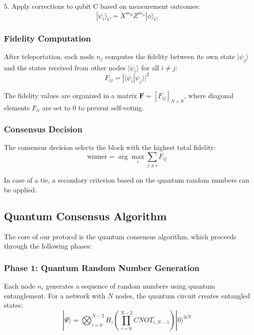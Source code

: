 \documentclass[11pt,a4paper]{article}
\begin{document}
5. Apply corrections to qubit C based on measurement outcomes:
   \begin{equation}
   |\psi_i\rangle_C = X^{m_B}Z^{m_A}|\phi\rangle_C
   \end{equation}

\subsubsection{Fidelity Computation}
After teleportation, each node $n_j$ computes the fidelity between its own state $|\psi_j\rangle$ and the states received from other nodes $|\psi_i\rangle$ for all $i \neq j$:
\begin{equation}
F_{ij} = |\langle\psi_i|\psi_j\rangle|^2
\end{equation}

The fidelity values are organized in a matrix $\mathbf{F} = [F_{ij}]_{N \times N}$, where diagonal elements $F_{ii}$ are set to 0 to prevent self-voting.

\subsubsection{Consensus Decision}
The consensus decision selects the block with the highest total fidelity:
\begin{equation}
\text{winner} = \arg\max_i \sum_{j \neq i} F_{ij}
\end{equation}

In case of a tie, a secondary criterion based on the quantum random numbers can be applied.

\subsection{Quantum Consensus Algorithm}
The core of our protocol is the quantum consensus algorithm, which proceeds through the following phases:

\subsubsection{Phase 1: Quantum Random Number Generation}
Each node $n_i$ generates a sequence of random numbers using quantum entanglement. For a network with $N$ nodes, the quantum circuit creates entangled states:
\begin{equation}
|\Psi\rangle = \bigotimes_{i=0}^{N-2} H_i \left( \prod_{i=0}^{N-2} CNOT_{i,N-1} \right) |0\rangle^{\otimes N}
\end{equation}
\end{document}
